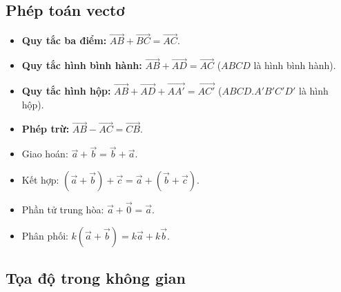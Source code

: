 \documentclass[12pt,a4paper]{article}
\begin{document}
\subsection{Phép toán vectơ}

\begin{congthuc}[title={Các quy tắc cộng, trừ}]
  \begin{itemize}
    \item \textbf{Quy tắc ba điểm:} $\overrightarrow{AB} + \overrightarrow{BC} = \overrightarrow{AC}$.
    \item \textbf{Quy tắc hình bình hành:} $\overrightarrow{AB} + \overrightarrow{AD} = \overrightarrow{AC}$ \;($ABCD$ là hình bình hành).
    \item \textbf{Quy tắc hình hộp:} $\overrightarrow{AB} + \overrightarrow{AD} + \overrightarrow{AA'} = \overrightarrow{AC'}$ \;($ABCD.A'B'C'D'$ là hình hộp).
    \item \textbf{Phép trừ:} $\overrightarrow{AB} - \overrightarrow{AC} = \overrightarrow{CB}$.
  \end{itemize}
\end{congthuc}

\begin{tinhchat}
  \begin{itemize}
    \item Giao hoán: $\vec{a} + \vec{b} = \vec{b} + \vec{a}$.
    \item Kết hợp: $(\vec{a} + \vec{b}) + \vec{c} = \vec{a} + (\vec{b} + \vec{c})$.
    \item Phần tử trung hòa: $\vec{a} + \vec{0} = \vec{a}$.
    \item Phân phối: $k(\vec{a} + \vec{b}) = k\vec{a} + k\vec{b}$.
  \end{itemize}
\end{tinhchat}

\subsection{Tọa độ trong không gian}
\end{document}
